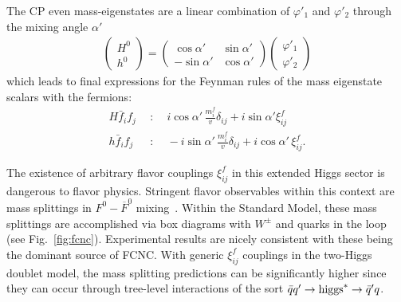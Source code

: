 \documentclass[12pt]{article}
\def\beq{\begin{eqnarray}}
\def\eeq{\end{eqnarray}}
\def\bea{\begin{eqnarray}}
\def\vector#1#2{\left( \begin{array}{c}#1\\ #2\end{array}\right)}
\begin{document}
The CP even mass-eigenstates are a linear combination of $\varphi'_1$ and $\varphi'_2$ through the mixing angle $\alpha'$
\beq
\vector{H^0}{h^0}=\left( \begin{array}{cc} 
\cos\alpha' & \sin\alpha' \\
-\sin\alpha' & \cos\alpha' \end{array}\right)
\vector{\varphi'_1}{\varphi'_2}
\eeq
which leads to final expressions for the Feynman rules of the mass eigenstate scalars with the fermions:
\bea
H\bar f_if_j~~& : &~~i\cos\alpha'\, \frac{m^f_{i}}{v}\delta_{ij}+i\sin\alpha' \xi_{ij}^f\\
h\bar f_if_j~~&:&~~-i\sin\alpha'\,  \frac{m^f_{i}}{v}\delta_{ij} +i\cos\alpha'\, \xi^f_{ij}.
\eeq

The existence of arbitrary flavor couplings $\xi^f_{ij}$ in this extended Higgs sector is dangerous to flavor physics. Stringent flavor observables within this context are mass splittings in $F^0-\overline{F}^0$ mixing~\cite{Atwood:1996vj}.  Within the Standard Model, these mass splittings are accomplished via box diagrams with $W^\pm$ and quarks in the loop (see Fig.~\ref{fig:fcnc}). Experimental results are nicely consistent with these being the dominant source of FCNC. With generic $\xi^f_{ij}$ couplings in the two-Higgs doublet model, the mass splitting predictions can be significantly higher since they can occur through tree-level interactions of the sort $\bar q q'\to {\rm higgs}^*\to\bar q' q$.
\end{document}
